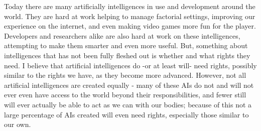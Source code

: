 Today there are many artificially intelligences in use and development around the world. They are hard at work helping to manage factorial settings, improving our experience on the internet, and even making video games more fun for the player. Developers and researchers alike are also hard at work on these intelligences, attempting to make them smarter and even more useful. But, something about intelligences that has not been fully fleshed out is whether and what rights they need. I believe that artificial intelligences do -or at least will- need rights, possibly similar to the rights we have, as they become more advanced. However, not all artificial intelligences are created equally - many of these AIs do not and will not ever even have access to the world beyond their responsibilities, and fewer still will ever actually be able to act as we can with our bodies; because of this not a large percentage of AIs created will even need rights, especially those similar to our own.